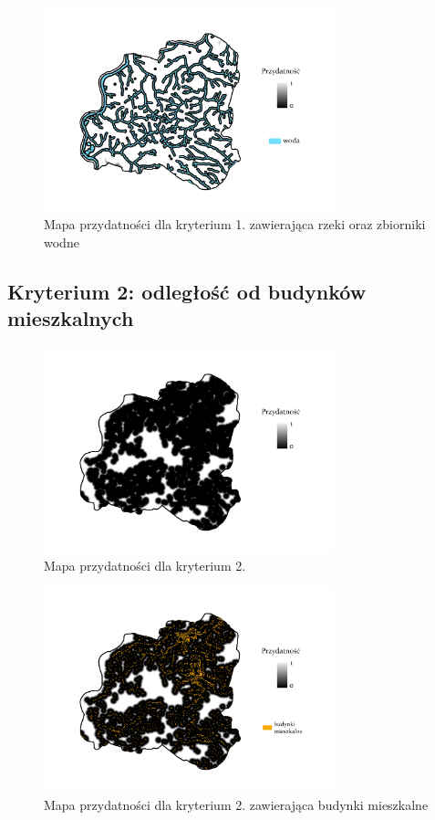\documentclass{article}
\begin{document}
\begin{figure}[H]
    \centering
    \includegraphics[width=0.75\textwidth]{img/plesna-kryterium1-woda.jpg}
    \caption*{Mapa przydatności dla kryterium 1. zawierająca rzeki oraz zbiorniki wodne}
\end{figure}

\subsection{Kryterium 2: odległość od budynków mieszkalnych}
\begin{figure}[H]
    \centering
    \includegraphics[width=0.75\textwidth]{img/plesna-kryterium2-layout.jpg}
    \caption*{Mapa przydatności dla kryterium 2.}
\end{figure}

\begin{figure}[H]
    \centering
    \includegraphics[width=0.75\textwidth]{img/plesna-kryterium2-budynki.jpg}
    \caption*{Mapa przydatności dla kryterium 2. zawierająca budynki mieszkalne}
\end{figure}
\end{document}
